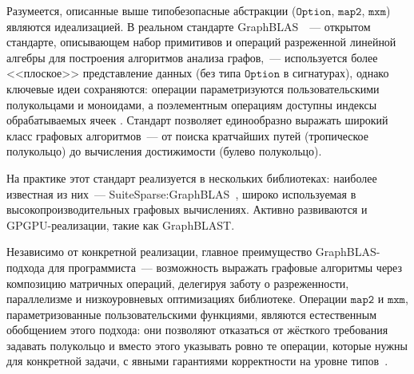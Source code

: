 Разумеется, описанные выше типобезопасные абстракции ($\texttt{Option}$, $\texttt{map2}$, $\texttt{mxm}$) являются идеализацией.
В реальном стандарте GraphBLAS~~--- открытом стандарте, описывающем набор примитивов и операций разреженной линейной алгебры для построения алгоритмов анализа графов,~--- используется более <<плоское>> представление данных (без типа $\texttt{Option}$ в сигнатурах), однако ключевые идеи сохраняются: операции параметризуются пользовательскими полукольцами и моноидами, а поэлементным операциям доступны индексы обрабатываемых ячеек%
.
Стандарт позволяет единообразно выражать широкий класс графовых алгоритмов~--- от поиска кратчайших путей (тропическое полукольцо) до вычисления достижимости (булево полукольцо).

На практике этот стандарт реализуется в нескольких библиотеках: наиболее известная из них~--- SuiteSparse:GraphBLAS~, широко используемая в высокопроизводительных графовых вычислениях.
Активно развиваются и GPGPU-реализации, такие как GraphBLAST.

Независимо от конкретной реализации, главное преимущество GraphBLAS-подхода для программиста~--- возможность выражать графовые алгоритмы через композицию матричных операций, делегируя заботу о разреженности, параллелизме и низкоуровневых оптимизациях библиотеке.
Операции $\texttt{map2}$ и $\texttt{mxm}$, параметризованные пользовательскими функциями, являются естественным обобщением этого подхода: они позволяют отказаться от жёсткого требования задавать полукольцо и вместо этого указывать ровно те операции, которые нужны для конкретной задачи, с явными гарантиями корректности на уровне типов~.
